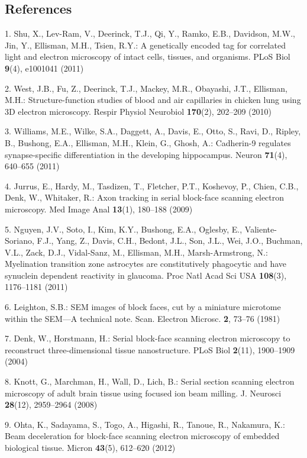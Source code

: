 \documentclass{article}
\begin{document}
\subsection*{References}
\begin{hangpars}\small
1. Shu, X., Lev-Ram, V., Deerinck, T.J., Qi, Y., Ramko, E.B., Davidson, M.W., Jin, Y., Ellisman, M.H., Tsien, R.Y.: A genetically encoded tag for correlated light and electron microscopy of intact cells, tissues, and organisms. PLoS Biol \textbf{9}(4), e1001041 (2011)

2. West, J.B., Fu, Z., Deerinck, T.J., Mackey, M.R., Obayashi, J.T., Ellisman, M.H.: Structure-function studies of blood and air capillaries in chicken lung using 3D electron microscopy. Respir Physiol Neurobiol \textbf{170}(2), 202–209 (2010)

3. Williams, M.E., Wilke, S.A., Daggett, A., Davis, E., Otto, S., Ravi, D., Ripley, B., Bushong, E.A., Ellisman, M.H., Klein, G., Ghosh, A.: Cadherin-9 regulates synapse-specific differentiation in the developing hippocampus. Neuron \textbf{71}(4), 640–655 (2011)

4. Jurrus, E., Hardy, M., Tasdizen, T., Fletcher, P.T., Koshevoy, P., Chien, C.B., Denk, W., Whitaker, R.: Axon tracking in serial block-face scanning electron microscopy. Med Image Anal \textbf{13}(1), 180–188 (2009)

5. Nguyen, J.V., Soto, I., Kim, K.Y., Bushong, E.A., Oglesby, E., Valiente-Soriano, F.J., Yang, Z., Davis, C.H., Bedont, J.L., Son, J.L., Wei, J.O., Buchman, V.L., Zack, D.J., Vidal-Sanz, M., Ellisman, M.H., Marsh-Armstrong, N.: Myelination transition zone astrocytes are constitutively phagocytic and have synuclein dependent reactivity in glaucoma. Proc Natl Acad Sci USA \textbf{108}(3), 1176–1181 (2011)

6. Leighton, S.B.: SEM images of block faces, cut by a miniature microtome within the SEM—A technical note. Scan. Electron Microsc. \textbf{2}, 73–76 (1981)

7. Denk, W., Horstmann, H.: Serial block-face scanning electron microscopy to reconstruct three-dimensional tissue nanostructure. PLoS Biol \textbf{2}(11), 1900–1909 (2004)

8. Knott, G., Marchman, H., Wall, D., Lich, B.: Serial section scanning electron microscopy of adult brain tissue using focused ion beam milling. J. Neurosci \textbf{28}(12), 2959–2964 (2008)

9. Ohta, K., Sadayama, S., Togo, A., Higashi, R., Tanoue, R., Nakamura, K.: Beam deceleration for block-face scanning electron microscopy of embedded biological tissue. Micron \textbf{43}(5), 612–620 (2012)


\end{hangpars}
\end{document}
